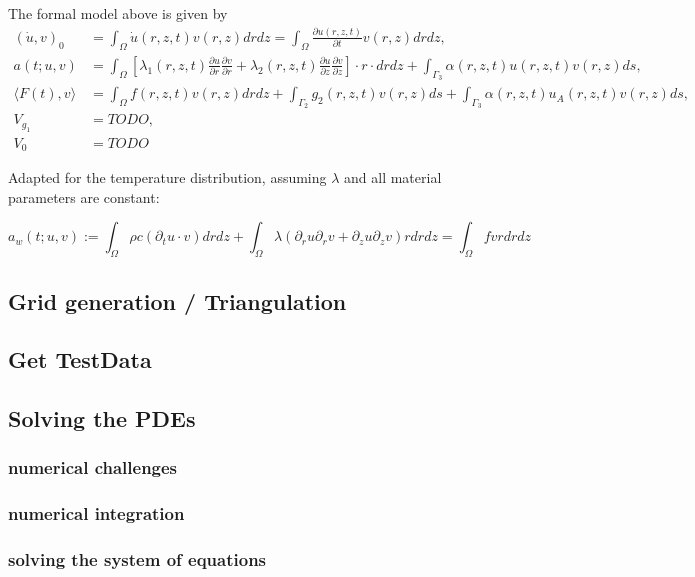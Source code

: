 \documentclass[parskip=half, titlepage=yes, 12pt, BCOR=12mm, DIV=calc]{scrartcl}
\begin{document}
The formal model above is given by 
\begin{align*}
    (\Dot{u},v)_0 &= \int_{\Omega} \Dot{u}(r,z,t)v(r,z) drdz = \int_{\Omega} \frac{\partial u(r,z,t)}{\partial t} v(r,z) drdz, \\
    a(t;u,v) &= \int_{\Omega} \left[ \lambda_1(r,z,t) \frac{\partial u}{\partial r} \frac{\partial v}{\partial r} + \lambda_2(r,z,t) \frac{\partial u}{\partial z} \frac{\partial v}{\partial z} \right] \cdot r \cdot drdz + \int_{\Gamma_3} \alpha(r,z,t)u(r,z,t)v(r,z) ds, \\
    \langle F(t),v \rangle &= \int_{\Omega} f(r,z,t)v(r,z) drdz + \int_{\Gamma_2} g_2(r,z,t)v(r,z) ds + \int_{\Gamma_3} \alpha(r,z,t)u_A(r,z,t)v(r,z) ds, \\
    V_{g_1} &= TODO, \\
    V_0 &= TODO
\end{align*}

Adapted for the temperature distribution, assuming $\lambda$ and all material parameters are constant: 

\begin{equation}
    a_w(t;u,v) := \int_{\Omega} \rho c (\partial_t u \cdot v) drdz + \int_{\Omega} \lambda (\partial_r u \partial_r v + \partial_z u \partial_z v) r drdz = \int_{\Omega} f v r dr dz
\end{equation}

\subsection{Grid generation / Triangulation}

\subsection{Get TestData}

\subsection{Solving the PDEs}
\subsubsection{numerical challenges}
\subsubsection{numerical integration}
\subsubsection{solving the system of equations}
\end{document}

